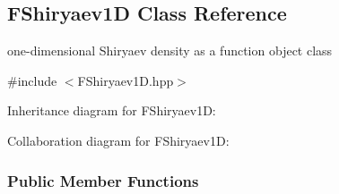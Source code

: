 \hypertarget{classFShiryaev1D}{\subsection{\-F\-Shiryaev1\-D \-Class \-Reference}
\label{classFShiryaev1D}
}


one-\/dimensional \-Shiryaev density as a function object class  




{\ttfamily \#include $<$\-F\-Shiryaev1\-D.\-hpp$>$}



\-Inheritance diagram for \-F\-Shiryaev1\-D\-:


\-Collaboration diagram for \-F\-Shiryaev1\-D\-:
\subsubsection*{\-Public \-Member \-Functions}
